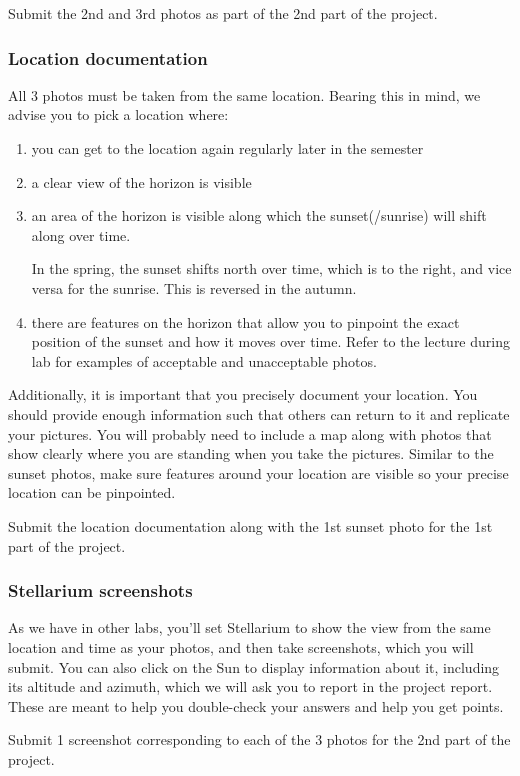 \documentclass[main.tex]{subfiles}
\begin{document}
Submit the 2nd and 3rd photos as part of the 2nd part of the project.

\subsubsection{Location documentation}
All 3 photos must be taken from the same location. Bearing this in mind, we advise you to pick a location where:
\begin{enumerate}
\item you can get to the location again regularly later in the semester
\item a clear view of the horizon is visible
\item an area of the horizon is visible along which the sunset(/sunrise) will shift along over time.

In the spring, the sunset shifts north over time, which is to the right, and vice versa for the sunrise. This is reversed in the autumn.
\item there are features on the horizon that allow you to pinpoint the exact position of the sunset and how it moves over time. Refer to the lecture during lab for examples of acceptable and unacceptable photos.
\end{enumerate}

Additionally, it is important that you precisely document your location. You should provide enough information such that others can return to it and replicate your pictures. You will probably need to include a map along with photos that show clearly where you are standing when you take the pictures. Similar to the sunset photos, make sure features around your location are visible so your precise location can be pinpointed.

Submit the location documentation along with the 1st sunset photo for the 1st part of the project.

\subsubsection{Stellarium screenshots}
As we have in other labs, you'll set Stellarium to show the view from the same location and time as your photos, and then take screenshots, which you will submit. You can also click on the Sun to display information about it, including its altitude and azimuth, which we will ask you to report in the project report. These are meant to help you double-check your answers and help you get points.

Submit 1 screenshot corresponding to each of the 3 photos for the 2nd part of the project.
\end{document}
